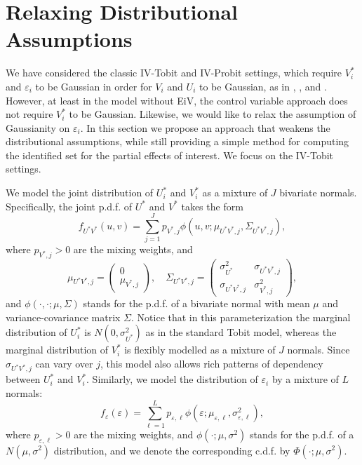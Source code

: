\documentclass[12pt]{article}
\begin{document}
\bigskip

\section{Relaxing Distributional Assumptions}\label{sec:Relax Gauss}

We have considered the classic IV-Tobit and IV-Probit settings, which
require $V_{i}^{\ast }$ and $\varepsilon _{i}$ to be Gaussian in order for $%
V_{i}$ and $U_{i}$ to be Gaussian, as in \cite{SmithBlundell1986Ecta}, \cite%
{RiversVuong1988JoE}, and \cite{Wooldridge2010Book}. However, at least in
the model without EiV, the control variable approach does not require $%
V_{i}^{\ast }$ to be Gaussian. Likewise, we would like to relax the
assumption of Gaussianity on $\varepsilon _{i}$. In this section we propose
an approach that weakens the distributional assumptions, while still
providing a simple method for computing the identified set for the partial
effects of interest. We focus on the IV-Tobit settings.

We model the joint distribution of $U_{i}^{\ast }$ and $V_{i}^{\ast }$ as a
mixture of $J$ bivariate normals. Specifically, the joint p.d.f. of $U^{\ast
}$ and $V^{\ast }$ takes the form %
\begin{equation*}
f_{U^{\ast }V^{\ast }}(u,v)=\sum_{j=1}^{J}p_{V^{\ast },j}\phi (u,v;\mu
_{U^{\ast }V^{\ast },j},\Sigma _{U^{\ast }V^{\ast },j}),
\end{equation*}%
where $p_{V^{\ast },j}>0$ are the mixing weights, and 
\begin{equation*}
\mu _{U^{\ast }V^{\ast },j}=%
\begin{pmatrix}
0 \\ 
\mu _{V^{\ast },j}%
\end{pmatrix}%
,\quad \Sigma _{U^{\ast }V^{\ast },j}=%
\begin{pmatrix}
\sigma _{U^{\ast }}^{2} & \sigma _{U^{\ast }V^{\ast },j} \\ 
\sigma _{U^{\ast }V^{\ast },j} & \sigma _{V^{\ast },j}^{2}%
\end{pmatrix}%
,
\end{equation*}%
and $\phi (\cdot ,\cdot ;\mu ,\Sigma )$ stands for the p.d.f. of a bivariate
normal with mean $\mu $ and variance-covariance matrix $\Sigma $. Notice
that in this parameterization the marginal distribution of $U_{i}^{\ast }$
is $N(0,\sigma _{U^{\ast }}^{2})$ as in the standard Tobit model, whereas
the marginal distribution of $V_{i}^{\ast }$ is flexibly modelled as a
mixture of $J$ normals. Since $\sigma _{U^{\ast }V^{\ast },j}$ can vary over 
$j$, this model also allows rich patterns of dependency between $U_{i}^{\ast
}$ and $V_{i}^{\ast }$. Similarly, we model the distribution of $\varepsilon
_{i}$ by a mixture of $L$ normals:%
\begin{equation*}
f_{\varepsilon }(\varepsilon )=\sum_{\ell =1}^{L}p_{\varepsilon ,\ell }\phi
(\varepsilon ;\mu _{\varepsilon ,\ell },\sigma _{\varepsilon ,\ell }^{2}),
\end{equation*}%
where $p_{\varepsilon ,\ell }>0$ are the mixing weights, and $\phi (\cdot
;\mu ,\sigma ^{2})$ stands for the p.d.f. of a $N\left( \mu ,\sigma
^{2}\right) $ distribution, and we denote the corresponding c.d.f. by $\Phi
(\cdot ;\mu ,\sigma ^{2})$.
\end{document}
